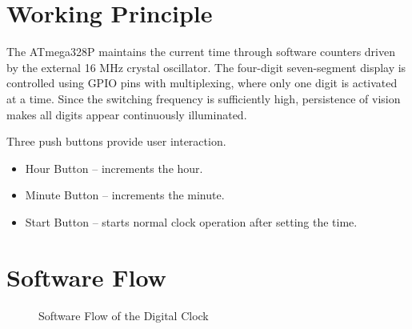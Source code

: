 \documentclass[11pt,a4paper]{report}
\begin{document}

\section{Working Principle}

The ATmega328P maintains the current time through software counters driven by the external 16 MHz crystal oscillator. The four-digit seven-segment display is controlled using GPIO pins with multiplexing, where only one digit is activated at a time. Since the switching frequency is sufficiently high, persistence of vision makes all digits appear continuously illuminated.

Three push buttons provide user interaction.

\begin{itemize}
\item Hour Button – increments the hour.
\item Minute Button – increments the minute.
\item Start Button – starts normal clock operation after setting the time.
\end{itemize}


\section{Software Flow}

\begin{figure}[H]
\centering


\caption{Software Flow of the Digital Clock}
\end{figure}
\end{document}
